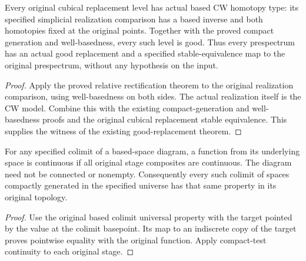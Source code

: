 \begin{proposition}
  \label{prop:actual-good-prespectrum-replacement}
  \leanok
  Every original cubical replacement level has actual based CW homotopy type: its specified simplicial realization comparison has a based inverse and both homotopies fixed at the original points. Together with the proved compact generation and well-basedness, every such level is good. Thus every prespectrum has an actual good replacement and a specified stable-equivalence map to the original prespectrum, without any hypothesis on the input.
\end{proposition}
\begin{proof}
  Apply the proved relative rectification theorem to the original realization comparison, using well-basedness on both sides. The actual realization itself is the CW model. Combine this with the existing compact-generation and well-basedness proofs and the original cubical replacement stable equivalence. This supplies the witness of the existing good-replacement theorem.
  \leanok
\end{proof}

\begin{proposition}
  \label{prop:actual-based-colimit-compact-generation}
  \leanok
  For any specified colimit of a based-space diagram, a function from its underlying space is continuous if all original stage composites are continuous. The diagram need not be connected or nonempty. Consequently every such colimit of spaces compactly generated in the specified universe has that same property in its original topology.
\end{proposition}
\begin{proof}
  Use the original based colimit universal property with the target pointed by the value at the colimit basepoint. Its map to an indiscrete copy of the target proves pointwise equality with the original function. Apply compact-test continuity to each original stage.
  \leanok
\end{proof}

